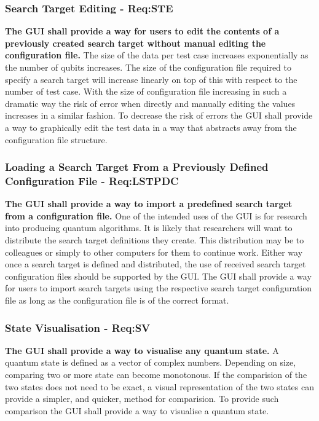 \subsubsection{Search Target Editing - Req:STE}
\label{sec:reqste}
\textbf{The GUI shall provide a way for users to edit the contents of a previously created search target without manual editing the configuration file.}
The size of the data per test case increases exponentially as the number of qubits increases.
The size of the configuration file required to specify a search target will increase linearly on top of this with respect to the number of test case.
With the size of configuration file increasing in such a dramatic way the risk of error when directly and manually editing the values increases in a similar fashion.
To decrease the risk of errors the GUI shall provide a way to graphically edit the test data in a way that abstracts away from the configuration file structure.

\subsubsection{Loading a Search Target From a Previously Defined Configuration File - Req:LSTPDC}
\label{sec:reqlstpdc}
\textbf{The GUI shall provide a way to import a predefined search target from a configuration file.}
One of the intended uses of the GUI is for research into producing quantum algorithms.
It is likely that researchers will want to distribute the search target definitions they create.
This distribution may be to colleagues or simply to other computers for them to continue work.
Either way once a search target is defined and distributed, the use of received search target configuration files should be supported by the GUI.
The GUI shall provide a way for users to import search targets using the respective search target configuration file as long as the configuration file is of the correct format.

\subsubsection{State Visualisation - Req:SV}
\label{sec:reqsv}
\textbf{The GUI shall provide a way to visualise any quantum state.}
A quantum state is defined as a vector of complex numbers.
Depending on size, comparing two or more state can become monotonous.
If the comparision of the two states does not need to be exact, a visual representation of the two states can provide a simpler, and quicker, method for comparision.
To provide such comparison the GUI shall provide a way to visualise a quantum state.

